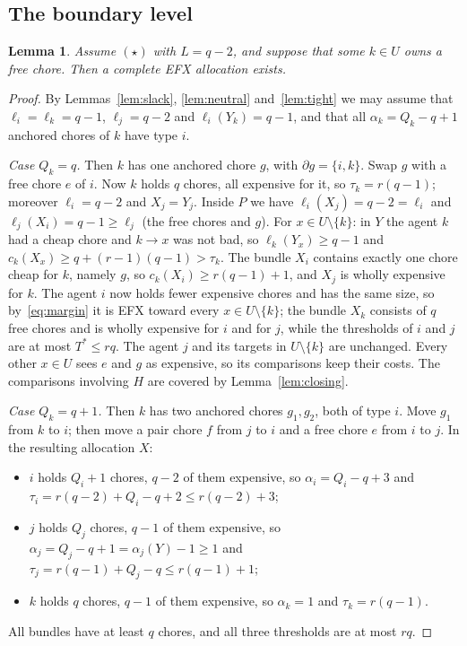 \documentclass{amsart}
\numberwithin{equation}{section}
\newtheorem{lemma}[theorem]{Lemma}
\theoremstyle{definition}
\theoremstyle{remark}
\newcommand{\bd}{\partial}
\begin{document}
\subsection{The boundary level}

\begin{lemma}\label{lem:boundary}
Assume $(\star)$ with $L=q-2$, and suppose that some $k\in U$ owns a free chore. Then a complete EFX allocation exists.
\end{lemma}

\begin{proof}
By Lemmas~\ref{lem:slack}, \ref{lem:neutral} and~\ref{lem:tight} we may assume that $\ell_i=\ell_k=q-1$, $\ell_j=q-2$ and $\ell_i(Y_k)=q-1$, and that all $\alpha_k=Q_k-q+1$ anchored chores of $k$ have type $i$.

\emph{Case $Q_k=q$.} Then $k$ has one anchored chore $g$, with $\bd g=\{i,k\}$. Swap $g$ with a free chore $e$ of $i$. Now $k$ holds $q$ chores, all expensive for it, so $\tau_k=r(q-1)$; moreover $\ell_i=q-2$ and $X_j=Y_j$. Inside $P$ we have $\ell_i(X_j)=q-2=\ell_i$ and $\ell_j(X_i)=q-1\ge\ell_j$ (the free chores and $g$). For $x\in U\setminus\{k\}$: in $Y$ the agent $k$ had a cheap chore and $k\to x$ was not bad, so $\ell_k(Y_x)\ge q-1$ and $c_k(X_x)\ge q+(r-1)(q-1)>\tau_k$. The bundle $X_i$ contains exactly one chore cheap for $k$, namely $g$, so $c_k(X_i)\ge r(q-1)+1$, and $X_j$ is wholly expensive for $k$. The agent $i$ now holds fewer expensive chores and has the same size, so by~\eqref{eq:margin} it is EFX toward every $x\in U\setminus\{k\}$; the bundle $X_k$ consists of $q$ free chores and is wholly expensive for $i$ and for $j$, while the thresholds of $i$ and $j$ are at most $T^*\le rq$. The agent $j$ and its targets in $U\setminus\{k\}$ are unchanged. Every other $x\in U$ sees $e$ and $g$ as expensive, so its comparisons keep their costs. The comparisons involving $H$ are covered by Lemma~\ref{lem:closing}.

\emph{Case $Q_k=q+1$.} Then $k$ has two anchored chores $g_1,g_2$, both of type $i$. Move $g_1$ from $k$ to $i$; then move a pair chore $f$ from $j$ to $i$ and a free chore $e$ from $i$ to $j$. In the resulting allocation $X$:
\begin{itemize}
\item $i$ holds $Q_i+1$ chores, $q-2$ of them expensive, so $\alpha_i=Q_i-q+3$ and $\tau_i=r(q-2)+Q_i-q+2\le r(q-2)+3$;
\item $j$ holds $Q_j$ chores, $q-1$ of them expensive, so $\alpha_j=Q_j-q+1=\alpha_j(Y)-1\ge1$ and $\tau_j=r(q-1)+Q_j-q\le r(q-1)+1$;
\item $k$ holds $q$ chores, $q-1$ of them expensive, so $\alpha_k=1$ and $\tau_k=r(q-1)$.
\end{itemize}
All bundles have at least $q$ chores, and all three thresholds are at most $rq$.


\end{proof}
\end{document}
